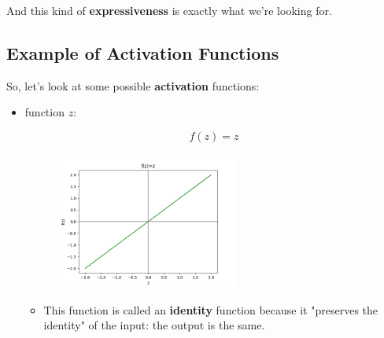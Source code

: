         And this kind of \textbf{expressiveness} is exactly what we're looking for.
        
    \subsection{Example of Activation Functions}
    
        So, let's look at some possible \textbf{activation} functions:
        
        \begin{itemize}
            \item {} function $z$:

                \begin{equation}
                    f(z) = z
                \end{equation}

                \begin{figure}[H]
                    \centering
                    \includegraphics[width=60mm,scale=0.4]{images/nn_images/identity_fn.png}
                \end{figure}
                

                \begin{itemize}
                    \item This function is called an \textbf{identity} function because it "preserves the identity" of the input: the output is the same.


\end{itemize}
\end{itemize}
